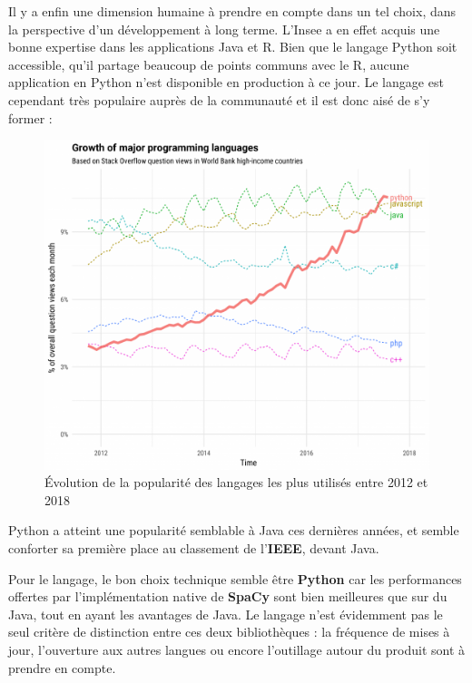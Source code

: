 Il y a enfin une dimension humaine à prendre en compte dans un tel choix, dans la perspective d'un développement à long terme. L'Insee a en effet acquis une bonne expertise dans les applications Java et R. Bien que le langage Python soit accessible, qu'il partage beaucoup de points communs avec le R, aucune application en Python n'est disponible en production à ce jour. Le langage est cependant très populaire auprès de la communauté et il est donc aisé de s'y former :
\vspace{10pt}
\begin{figure}[H]
    \centering
    \includegraphics[scale=0.36]{images/languages-var.png}
    \caption{Évolution de la popularité des langages les plus utilisés entre 2012 et 2018}
    \label{fig:lang-var}
\end{figure}
\vspace{5pt}
Python a atteint une popularité semblable à Java ces dernières années, et semble conforter sa première place au classement de l'\textbf{IEEE}, devant Java.

Pour le langage, le bon choix technique semble être \textbf{Python} car les performances offertes par l'implémentation native de \textbf{SpaCy} sont bien meilleures que sur du Java, tout en ayant les avantages de Java. Le langage n'est évidemment pas le seul critère de distinction entre ces deux bibliothèques : la fréquence de mises à jour, l'ouverture aux autres langues ou encore l'outillage autour du produit sont à prendre en compte.
\label{section 3.1.1}

